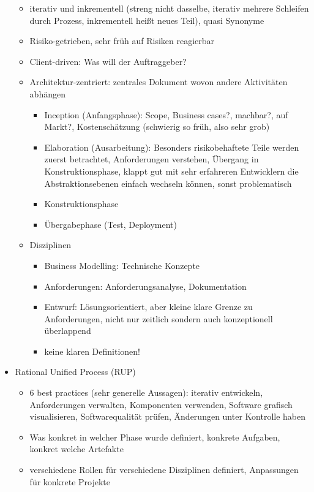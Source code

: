 \documentclass[paper=a4, fontsize=11pt]{scrartcl} %
\numberwithin{equation}{section} %
\numberwithin{figure}{section} %
\numberwithin{table}{section} %
\begin{document}
\begin{itemize}
\begin{itemize}
    \item iterativ und inkrementell (streng nicht dasselbe, iterativ mehrere Schleifen durch Prozess, inkrementell heißt neues Teil), quasi Synonyme
    \item Risiko-getrieben, sehr früh auf Risiken reagierbar
    \item Client-driven: Was will der Auftraggeber?
    \item Architektur-zentriert: zentrales Dokument wovon andere Aktivitäten abhängen
    \begin{itemize}
      \item Inception (Anfangsphase): Scope, Business cases?, machbar?, auf Markt?, Kostenschätzung (schwierig so früh, also sehr grob)
      \item Elaboration (Ausarbeitung): Besonders risikobehaftete Teile werden zuerst betrachtet, Anforderungen verstehen, Übergang in Konstruktionsphase, klappt gut mit sehr erfahreren Entwicklern die Abstraktionsebenen einfach wechseln können, sonst problematisch
      \item Konstruktionsphase
      \item Übergabephase (Test, Deployment)
    \end{itemize}
    \item Disziplinen
    \begin{itemize}
      \item Business Modelling: Technische Konzepte
      \item Anforderungen: Anforderungsanalyse, Dokumentation
      \item Entwurf: Lösungsorientiert, aber kleine klare Grenze zu Anforderungen, nicht nur zeitlich sondern auch konzeptionell überlappend
      \item keine klaren Definitionen!
    \end{itemize}
  \end{itemize}
  \item Rational Unified Process (RUP)
  \begin{itemize}
    \item 6 best practices (sehr generelle Aussagen): iterativ entwickeln, Anforderungen verwalten, Komponenten verwenden, Software grafisch visualisieren, Softwarequalität prüfen, Änderungen unter Kontrolle haben
    \item Was konkret in welcher Phase wurde definiert, konkrete Aufgaben, konkret welche Artefakte
    \item verschiedene Rollen für verschiedene Disziplinen definiert, Anpassungen für konkrete Projekte

\end{itemize}
\end{itemize}
\end{document}

